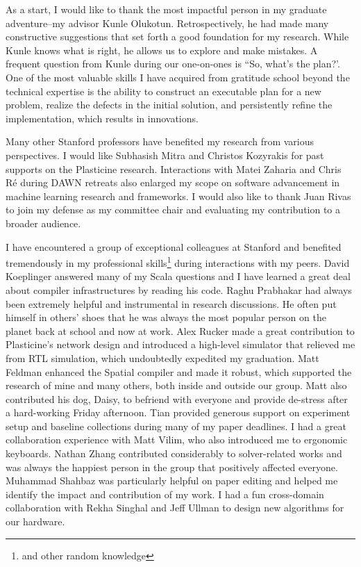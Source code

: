 
As a start, I would like to thank the most impactful person in my graduate adventure--my advisor
Kunle Olukotun.
Retrospectively, he had made many constructive suggestions that set forth a good foundation for my research.
While Kunle knows what is right, he allows us to explore and make mistakes.
A frequent question from Kunle during our one-on-ones is ``So, what's the plan?'.
One of the most valuable skills I have acquired from gratitude school beyond the technical expertise is the ability to construct an executable plan for a new problem, realize the defects in the initial solution, and persistently refine the implementation, which results in innovations.

Many other Stanford professors have benefited my research from various perspectives.
I would like Subhasish Mitra and Christos Kozyrakis for past supports on the Plasticine research.
Interactions with Matei Zaharia and Chris R\'e during DAWN retreats also enlarged my scope on 
software advancement in machine learning research and frameworks.
I would also like to thank Juan Rivas to join my defense as my committee chair and evaluating my
contribution to a broader audience.

I have encountered a group of exceptional colleagues at Stanford and
benefited tremendously in my professional skills\footnote{and other random knowledge} during interactions with my peers.
David Koeplinger answered many of my Scala questions and I have learned a great deal about compiler
infrastructures by reading his code.
Raghu Prabhakar had always been extremely helpful and instrumental in research discussions. 
He often put himself in others' shoes that he was always the most popular person on the planet back at school and now at work.
Alex Rucker made a great contribution to Plasticine's network design and introduced a high-level simulator that relieved me from RTL simulation, which undoubtedly expedited my graduation.
Matt Feldman enhanced the Spatial compiler and made it robust, which supported the research of mine and many
others, both inside and outside our group.
Matt also contributed his dog, Daisy, to befriend with everyone and 
provide de-stress after a hard-working Friday afternoon.
Tian provided generous support on experiment setup and baseline collections during many of my paper deadlines.
I had a great collaboration experience with Matt Vilim, who also introduced me to ergonomic keyboards.
Nathan Zhang contributed considerably to solver-related works and was always the happiest person in the group that positively affected everyone.
Muhammad Shahbaz was particularly helpful on paper editing and helped me identify the impact and contribution of my work.
I had a fun cross-domain collaboration with Rekha Singhal and Jeff Ullman to design new algorithms for our
hardware.

